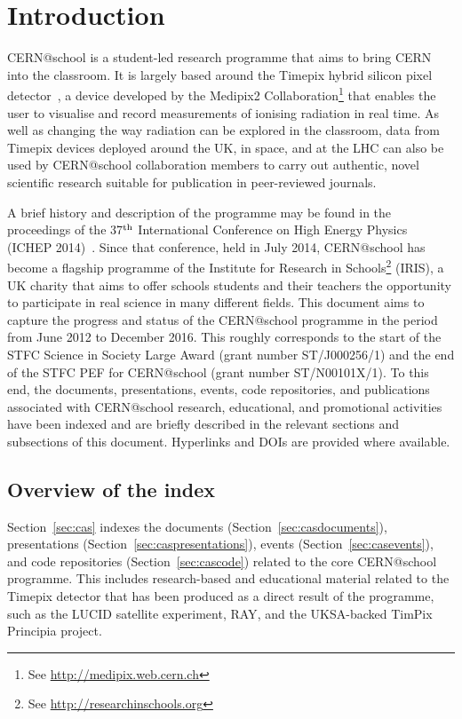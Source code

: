 \section{Introduction}
\label{sec:intro}
CERN@school is a student-led research programme that aims to bring
\acs{CERN} into the classroom.
It is largely based around the
Timepix hybrid silicon pixel
detector~\cite{Timepix2007,TimepixErratum2008},
a device developed by the Medipix2 Collaboration\footnote{%
See \url{http://medipix.web.cern.ch}}
that enables the user to visualise and record measurements of
ionising radiation in real time.
As well as changing the way radiation can be explored in the classroom,
data from Timepix devices deployed around the UK, in space, and
at the \ac{LHC} can also be used by
CERN@school collaboration members to carry out authentic, novel scientific
research suitable for publication in peer-reviewed journals.
%

A brief history and description of the programme may be found in
the proceedings of the 37$^{\textrm{\scriptsize th}}$ International Conference on
High Energy Physics (ICHEP 2014)~\cite{Whyntie2016b}.
%
Since that conference, held in July 2014, CERN@school has become a 
flagship programme of the
Institute for Research in Schools\footnote{%
See \url{http://researchinschools.org}} (IRIS),
a UK charity that aims to offer schools students and their teachers
the opportunity to participate in real science in many different fields.
%
This document aims to capture the progress and status of the
CERN@school programme in the period from June 2012
to December 2016.
This roughly corresponds to the start of the
\ac{STFC}
Science in Society Large Award (grant number ST/J000256/1)
and the end of the
\ac{STFC} \ac{PEF} for CERN@school
(grant number ST/N00101X/1).
%
To this end, the documents, presentations,
events, code repositories, and publications associated with
CERN@school research, educational, and promotional activities
have been indexed and are briefly described in the relevant
sections and subsections of this document.
%
Hyperlinks and \acp{DOI} are provided where
available.
%

\subsection{Overview of the index}
\label{sec:introoverview}
Section~\ref{sec:cas} indexes the
documents (Section~\ref{sec:casdocuments}),
presentations (Section~\ref{sec:caspresentations}),
events (Section~\ref{sec:casevents}),
and
code repositories (Section~\ref{sec:cascode})
related to the core CERN@school programme.
This includes research-based and educational material related to
the Timepix detector that has been produced as a direct result of the
programme, such as the
\acf{LUCID} %
satellite experiment,
\acf{RAY}, %
and
the \acl{UKSA}-backed TimPix Principia project.
%


